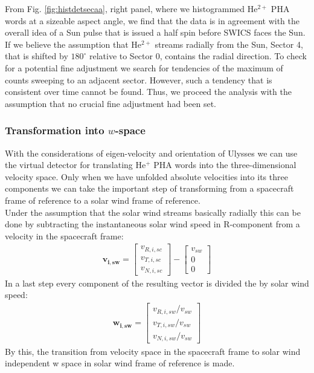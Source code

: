 From Fig. \ref{fig:histdetsecaa}, right panel, where we histogrammed $\mathrm{He^{2+}}$ PHA words at a sizeable aspect angle, we find that the data is in agreement with the overall idea of a Sun pulse that is issued a half spin before SWICS faces the Sun. If we believe the assumption that $\mathrm{He^{2+}}$ streams radially from the Sun, Sector 4, that is shifted by $180^\circ$ relative to Sector 0, contains the radial direction. 
To check for a potential fine adjustment we search for tendencies of the maximum of counts sweeping to an adjacent sector. However, such a tendency that is consistent over time cannot be found. Thus, we proceed the analysis with the assumption that no crucial fine adjustment had been set. 
\subsubsection{Transformation into $w$-space}
With the considerations of eigen-velocity and orientation of Ulysses we can use the virtual detector for translating $\mathrm{He^{+}}$ PHA words into the three-dimensional velocity space. Only when we have unfolded absolute velocities into its three components we can take the important step of transforming from a spacecraft frame of reference to a solar wind frame of reference. \\
Under the assumption that the solar wind streams basically radially this can be done by subtracting the instantaneous solar wind speed in R-component from a velocity in the spacecraft frame: 
\begin{align*}
\mathbf{v_{i,sw}} = \begin{bmatrix}v_{R,i,sc}\\v_{T,i,sc}\\v_{N,i,sc}\end{bmatrix} - \begin{bmatrix}v_{sw}\\0\\0\end{bmatrix}
\end{align*}
In a last step every component of the resulting vector is divided the by solar wind speed:
\begin{align*}
\mathbf{w_{i,sw}} = \begin{bmatrix}v_{R,i,sw} / v_{sw}\\v_{T,i,sw} / v_{sw}\\v_{N,i,sw} / v_{sw}\end{bmatrix}
\end{align*}
By this, the transition from velocity space in the spacecraft frame to solar wind independent w space in solar wind frame of reference is made.
%
%
%
%
